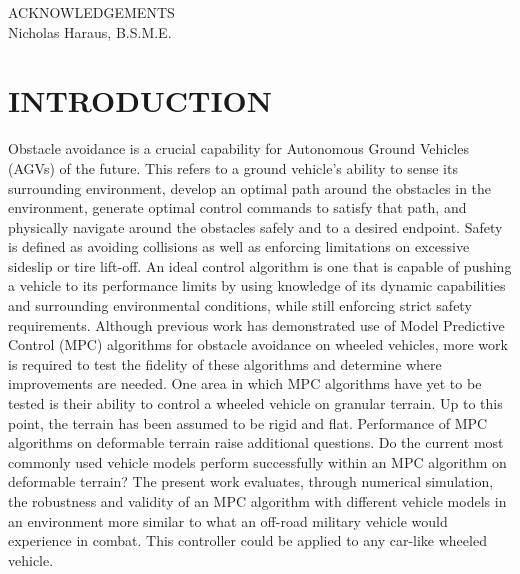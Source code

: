 \documentclass[12pt,onecolumn]{report}
\begin{document}
\setcounter{page}{1}
ACKNOWLEDGEMENTS\\
\vspace{0.2in}
Nicholas Haraus, B.S.M.E.\\
\vspace{0.2in}

\newpage
\begingroup
\renewcommand{\vspace}[2]{}%
\tableofcontents
\endgroup



\newpage
\begingroup
\renewcommand{\vspace}[2]{}%
{}
\listoftables
\endgroup
\newpage
\begingroup
{}
\renewcommand{\vspace}[2]{}%
\listoffigures
\endgroup

\newpage
{}
\setcounter{page}{1}
\chapter{INTRODUCTION}\label{c:introduction}

Obstacle avoidance is a crucial capability for Autonomous Ground Vehicles (AGVs) of the future. This refers to a ground vehicle's ability to sense its surrounding environment, develop an optimal path around the obstacles in the environment, generate optimal control commands to satisfy that path, and physically navigate around the obstacles safely and to a desired endpoint. Safety is defined as avoiding collisions as well as enforcing limitations on excessive sideslip or tire lift-off. An ideal control algorithm is one that is capable of pushing a vehicle to its performance limits by using knowledge of its dynamic capabilities and surrounding environmental conditions, while still enforcing strict safety requirements. Although previous work has demonstrated use of Model Predictive Control (MPC) algorithms for obstacle avoidance on wheeled vehicles, more work is required to test the fidelity of these algorithms and determine where improvements are needed. One area in which MPC algorithms have yet to be tested is their ability to control a wheeled vehicle on granular terrain. Up to this point, the terrain has been assumed to be rigid and flat. Performance of MPC algorithms on deformable terrain raise additional questions. Do the current most commonly used vehicle models perform successfully within an MPC algorithm on deformable terrain? The present work evaluates, through numerical simulation, the robustness and validity of an MPC algorithm with different vehicle models in an environment more similar to what an off-road military vehicle would experience in combat. This controller could be applied to any car-like wheeled vehicle.
\end{document}
